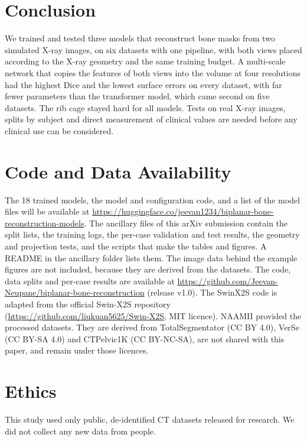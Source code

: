 \documentclass[11pt]{article}
\begin{document}
\section{Conclusion}
We trained and tested three models that reconstruct bone masks from two simulated X-ray images, on six datasets with one pipeline, with both views placed according to the X-ray geometry and the same training budget. A multi-scale network that copies the features of both views into the volume at four resolutions had the highest Dice and the lowest surface errors on every dataset, with far fewer parameters than the transformer model, which came second on five datasets. The rib cage stayed hard for all models. Tests on real X-ray images, splits by subject and direct measurement of clinical values are needed before any clinical use can be considered.

\section*{Code and Data Availability}
The 18 trained models, the model and configuration code, and a list of the model files will be available at \url{https://huggingface.co/jeevan1234/biplanar-bone-reconstruction-models}. The ancillary files of this arXiv submission contain the split lists, the training logs, the per-case validation and test results, the geometry and projection tests, and the scripts that make the tables and figures. A README in the ancillary folder lists them. The image data behind the example figures are not included, because they are derived from the datasets. The code, data splits and per-case results are available at \url{https://github.com/Jeevan-Neupane/biplanar-bone-reconstruction} (release v1.0). The SwinX2S code is adapted from the official Swin-X2S repository (\url{https://github.com/liukuan5625/Swin-X2S}, MIT licence). NAAMII provided the processed datasets. They are derived from TotalSegmentator (CC BY 4.0), VerSe (CC BY-SA 4.0) and CTPelvic1K (CC BY-NC-SA), are not shared with this paper, and remain under those licences.

\section*{Ethics}
This study used only public, de-identified CT datasets released for research. We did not collect any new data from people.
\end{document}
